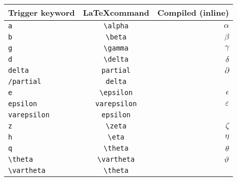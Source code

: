 \documentclass[a4paper,11pt]{scrartcl}
\begin{document}
\thispagestyle{plain}

\begin{table}[tb]
  \begin{center}
    \begin{tabular}{lcr}
    \hline
    \multicolumn{1}{c}{\bf Trigger keyword}    &    \multicolumn{1}{c}{\bf \LaTeX command}    &    \multicolumn{1}{c}{\bf Compiled (inline)}   \\
    \hline
    \verb|a|                     &    \verb|\alpha|                                               &    $\alpha$  \\
    \verb|b|                     &    \verb|\beta|                                                &    $\beta$  \\
    \verb|g|                     &    \verb|\gamma|                                               &    $\gamma$  \\
    \verb|d|                     &    \verb|\delta|                                               &    $\delta$  \\
    \verb|delta|                 &    \verb|partial|                                              &    $\partial$  \\
    \verb|/partial|              &    \verb|delta|                                                &    $\mbox{}$  \\
    \verb|e|                     &    \verb|\epsilon|                                             &    $\epsilon$  \\
    \verb|epsilon|               &    \verb|  varepsilon  |                                           &    $\varepsilon$  \\
    \verb|varepsilon    |            &    \verb|epsilon|                                              &    $\mbox{}$  \\
    \verb|z|                     &    \verb|\zeta|                                                &    $\zeta$  \\
    \verb|h|                     &    \verb|\eta|                                                 &    $\eta$  \\
    \verb|q|                     &    \verb|\theta|                                               &    $\theta$  \\
    \verb|\theta|                &    \verb|\vartheta|                                            &    $\vartheta$  \\
    \verb|\vartheta|             &    \verb|\theta|                                               &    \mbox{}  \\

\end{tabular}
\end{center}
\end{table}
\end{document}
